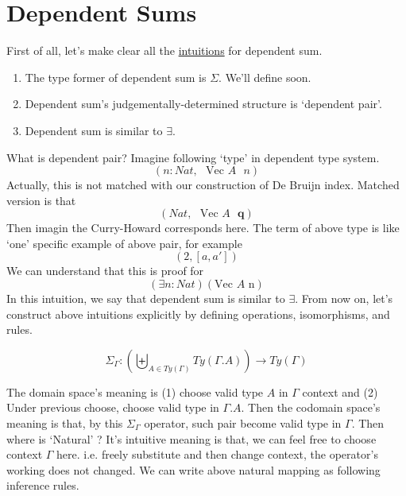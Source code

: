 \documentclass[12pt, a4paper, openany, twoside]{book}
\theoremstyle{definition}
\theoremstyle{remark}
\theoremstyle{plain}
\numberwithin{equation}{section}
\begin{document}
\section{Dependent Sums}

First of all, let's make clear all the \hyperlink{intuition-2.1.}{intuitions} for dependent sum. 
\begin{enumerate}
    \item The type former of dependent sum is $\Sigma$. We'll define soon. 
    \item Dependent sum's judgementally-determined structure is \lq dependent pair'. 
    \item Dependent sum is similar to $\exists$. 
\end{enumerate}

What is dependent pair? Imagine following \lq type' in dependent type system. 
\[(n : Nat,\text{  } \text{Vec } A\text{ }n)\]
Actually, this is not matched with our construction of De Bruijn index. Matched version is that 
\[(Nat, \text{  } \text{Vec } A\text{ }\mathbf{q})\]
Then imagin the Curry-Howard corresponds here. The term of above type is like \lq one' specific example of above pair, for example
\[(2, [a, a'])\]
We can understand that this is proof for 
\[(\exists n : Nat)(\text{Vec }A\text{ n})\]
In this intuition, we say that dependent sum is similar to $\exists$. From now on, 
let's construct above intuitions explicitly by defining operations, isomorphisms, and rules. 

\begin{tcolorbox}[colback=yellow!10!white,colframe=green!75!black,title=Construction 2.2.1. Natural Type Formal]
\[\Sigma_{\Gamma} : \left(\biguplus_{A \in Ty(\Gamma)}Ty(\Gamma.A)\right) \rightarrow Ty(\Gamma)\]
\end{tcolorbox}

The domain space's meaning is (1) choose valid type $A$ in $\Gamma$ context and (2) Under previous choose, choose valid type in $\Gamma.A$. 
Then the codomain space's meaning is that, by this $\Sigma_{\Gamma}$ operator, such pair become valid type in $\Gamma$. Then 
where is \lq Natural' ? It's intuitive meaning is that, we can feel free to choose context $\Gamma$ here. i.e. freely substitute and then change context, the 
operator's working does not changed. We can write above natural mapping as following inference rules. 

\begin{tcolorbox}[colback=yellow!10!white,colframe=green!75!black,title=Construction 2.2.1. Natural Type Formal ( inference rule ver. )]
\end{tcolorbox}
\end{document}
